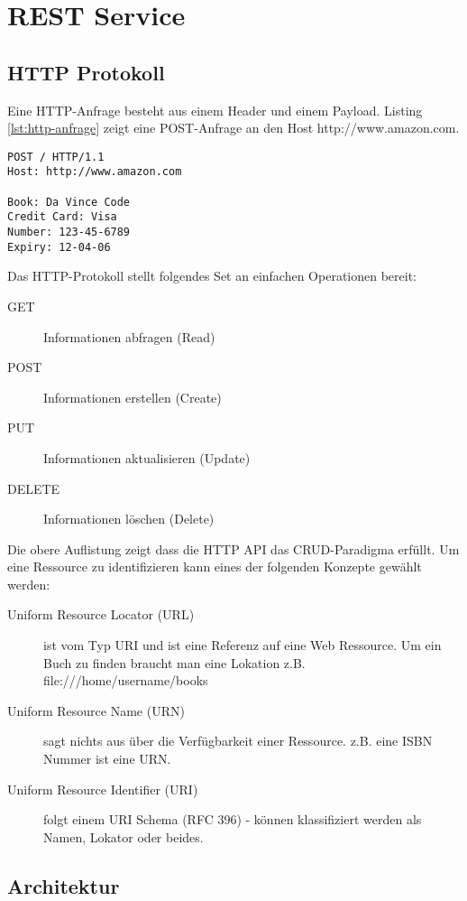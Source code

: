 \chapter{REST Service}

\section{HTTP Protokoll}

Eine HTTP-Anfrage besteht aus einem Header und einem Payload. Listing \ref{lst:http-anfrage} zeigt eine POST-Anfrage an den Host http://www.amazon.com. 

\begin{lstlisting}[caption=HTTP-Anfrage, label=lst:http-anfrage]
POST / HTTP/1.1
Host: http://www.amazon.com

Book: Da Vince Code
Credit Card: Visa
Number: 123-45-6789
Expiry: 12-04-06
\end{lstlisting}

Das HTTP-Protokoll stellt folgendes Set an einfachen Operationen bereit:

\begin{description}
	\item[GET] Informationen abfragen (Read)
	\item[POST] Informationen erstellen (Create)
	\item[PUT] Informationen aktualisieren (Update)
	\item[DELETE] Informationen löschen (Delete) 
\end{description}

Die obere Auflistung zeigt dass die HTTP API das CRUD-Paradigma erfüllt. Um eine Ressource zu identifizieren kann eines der folgenden Konzepte gewählt werden:

\begin{description}
	\item[Uniform Resource Locator (URL)] ist vom Typ URI und ist eine Referenz auf eine Web Ressource. Um ein Buch zu finden braucht man eine Lokation z.B. file:///home/username/books
	\item[Uniform Resource Name (URN)] sagt nichts aus über die Verfügbarkeit einer Ressource. z.B. eine ISBN Nummer ist eine URN.
	\item[Uniform Resource Identifier (URI)] folgt einem URI Schema (RFC 396) - können klassifiziert werden als Namen, Lokator oder beides.
\end{description}

\section{Architektur}

